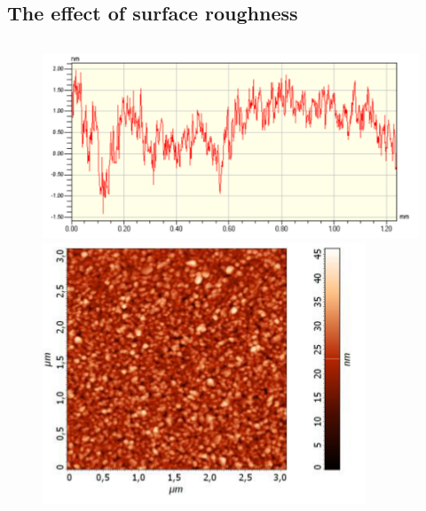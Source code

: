 \documentclass{beamer}
\begin{document}
\begin{frame}
\end{frame}

\subsection{The effect of surface roughness}
\begin{frame}
	\begin{columns}
		\begin{column}{0.5\textwidth}
			\begin{figure}
				\includegraphics[width=\textwidth]{../images/multilayer/plp-afm-chropo-1d.png}\\
				\includegraphics[width=\textwidth]{../images/multilayer/plp-afm-chropo.png}\\

\end{figure}
\end{column}
\end{columns}
\end{frame}
\end{document}
